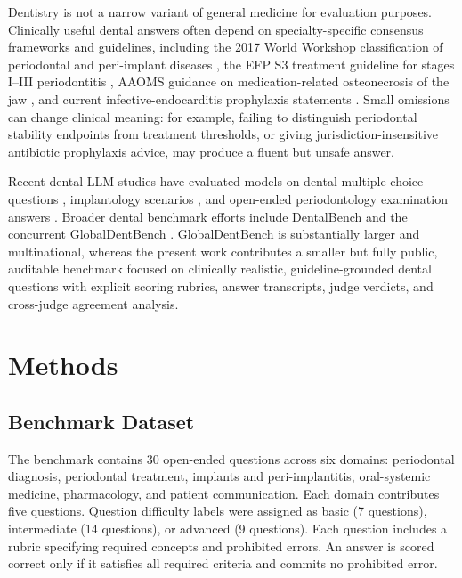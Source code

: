 \documentclass[11pt]{article}
\begin{document}
Dentistry is not a narrow variant of general medicine for evaluation purposes.
Clinically useful dental answers often depend on specialty-specific consensus frameworks and guidelines, including the 2017 World Workshop classification of periodontal and peri-implant diseases \cite{tonetti2018staging,papapanou2018periodontitis}, the EFP S3 treatment guideline for stages I--III periodontitis \cite{sanz2020efp}, AAOMS guidance on medication-related osteonecrosis of the jaw \cite{ruggiero2022mronj}, and current infective-endocarditis prophylaxis statements \cite{wilson2021ie}.
Small omissions can change clinical meaning: for example, failing to distinguish periodontal stability endpoints from treatment thresholds, or giving jurisdiction-insensitive antibiotic prophylaxis advice, may produce a fluent but unsafe answer.

Recent dental LLM studies have evaluated models on dental multiple-choice questions \cite{nguyen2025dentalmcq}, implantology scenarios \cite{wu2025implantology}, and open-ended periodontology examination answers \cite{ramlogan2025periodontology}.
Broader dental benchmark efforts include DentalBench \cite{zhu2025dentalbench} and the concurrent GlobalDentBench \cite{zhao2026globaldentbench}.
GlobalDentBench is substantially larger and multinational, whereas the present work contributes a smaller but fully public, auditable benchmark focused on clinically realistic, guideline-grounded dental questions with explicit scoring rubrics, answer transcripts, judge verdicts, and cross-judge agreement analysis.

\section{Methods}

\subsection{Benchmark Dataset}

The benchmark contains 30 open-ended questions across six domains: periodontal diagnosis, periodontal treatment, implants and peri-implantitis, oral-systemic medicine, pharmacology, and patient communication.
Each domain contributes five questions.
Question difficulty labels were assigned as basic (7 questions), intermediate (14 questions), or advanced (9 questions).
Each question includes a rubric specifying required concepts and prohibited errors.
An answer is scored correct only if it satisfies all required criteria and commits no prohibited error.
\end{document}
